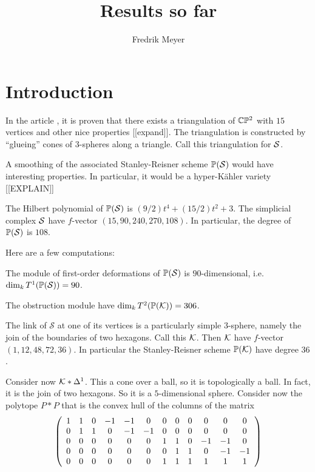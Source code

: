 \documentclass[11pt, english]{article}
\begin{document}
\title{Results so far}
\author{Fredrik Meyer}
\maketitle 

\section{Introduction}

In the article \cite{gaifullin_triangulation}, it is proven that there exists a triangulation of $\C \PP^2$ with $15$ vertices and other nice properties [[expand]]. The triangulation is constructed by ``glueing'' cones of $3$-spheres along a triangle.  Call this triangulation for $\S$.

A smoothing of the associated Stanley-Reisner scheme $\PP(\S)$ would have interesting properties. In particular, it would be a hyper-Kähler variety [[EXPLAIN]]

The Hilbert polynomial of $\PP(\S)$ is $(9/2) t^{4}+(15/2) t^{2}+3$. The simplicial complex $\S$ have $f$-vector $(15,90,240,270,108)$. In particular, the degree of $\PP(\S)$ is $108$.

Here are a few computations:
\begin{lemma}
The module of first-order deformations of $\PP(\S)$ is $90$-dimensional, i.e. $\dim_k T^1(\PP(\S)) = 90$.
\end{lemma}
\begin{lemma}
The obstruction module have $\dim_k T^2(\PP(\K))=306$.
\end{lemma}

The link of $\mathcal S$ at one of its vertices is a particularly simple $3$-sphere, namely the join of the boundaries of two hexagons. Call this $\K$. Then $\K$ have $f$-vector $(1, 12, 48, 72, 36)$. In particular the Stanley-Reisner scheme $\PP(\K)$ have degree $36$.

Consider now $\K \ast \Delta^1$. This a cone over a ball, so it is topologically a ball. In fact, it is the join of two hexagons. So it is a $5$-dimensional sphere. Consider now the polytope $P \ast P$ that is the convex hull of the columns of the matrix
\[
\left(
\begin{array}{*{12}c}
 1 & 1 & 0 & -1 & -1& 0 & 0 & 0 & 0 & 0 & 0 & 0 \\
 0 & 1 & 1 & 0 & -1 & -1& 0 & 0 & 0  & 0 & 0 & 0 \\
 0 & 0 & 0 & 0 & 0 & 0 & 1 & 1 & 0  & -1 & -1 & 0 \\
 0 & 0 & 0 & 0 & 0 & 0 & 0 & 1 & 1  & 0 & -1 & -1 \\
 0 & 0 & 0 & 0 & 0 & 0 & 1 & 1 & 1  & 1 & 1 & 1 \\
\end{array}
\right) \]
\end{document}
